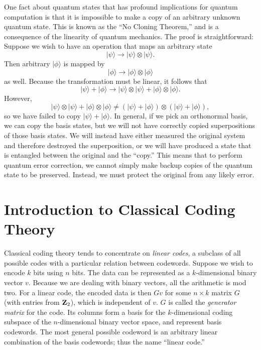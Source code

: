 \documentclass{report}
\newcommand{\ket}[1]{|{#1}\rangle}
\begin{document}
One fact about quantum states that has profound implications for quantum
computation is that it is impossible to make a copy of an arbitrary
unknown quantum state.  This is known as the ``No Cloning Theorem,''
\cite{no-cloning} and is a consequence of the linearity of quantum mechanics.
The proof is straightforward:  Suppose we wish to have an operation that
maps an arbitrary state 
\begin{equation}
\ket{\psi} \rightarrow \ket{\psi} \otimes \ket{\psi}.
\end{equation}
Then arbitrary $\ket{\phi}$ is mapped by
\begin{equation}
\ket{\phi} \rightarrow \ket{\phi} \otimes \ket{\phi}
\end{equation}
as well.  Because the transformation must be linear, it follows that
\begin{equation}
\ket{\psi} + \ket{\phi} \rightarrow \ket{\psi} \otimes \ket{\psi} +
\ket{\phi} \otimes \ket{\phi}.
\end{equation}
However,
\begin{equation}
\ket{\psi} \otimes \ket{\psi} + \ket{\phi} \otimes \ket{\phi} \neq
(\ket{\psi} + \ket{\phi}) \otimes (\ket{\psi} + \ket{\phi}),
\end{equation}
so we have failed to copy $\ket{\psi} + \ket{\phi}$.  In general, if we
pick an orthonormal basis, we can copy the basis states, but we will
not have correctly copied superpositions of those basis states.  We will
instead have either measured the original system and therefore destroyed the
superposition, or we will have produced a state that is entangled between
the original and the ``copy.''  This means that to perform quantum error
correction, we cannot simply make backup copies of the quantum state to
be preserved.  Instead, we must protect the original from any likely error.

\section{Introduction to Classical Coding Theory}
\label{sec-classical}

Classical coding theory tends to concentrate on {\em linear codes}, a 
subclass of all possible codes with a particular relation between codewords.  
Suppose we wish to encode $k$ bits using $n$ bits.  The data can be 
represented as a $k$-dimensional binary vector $v$.  Because we are 
dealing with binary vectors, all the arithmetic is mod two.  For a linear code, 
the encoded data is then $G v$ for some $n \times k$ matrix $G$ (with 
entries from ${\bf Z}_2$), which is independent of $v$.  $G$ is called the 
{\em generator matrix} for the code.  Its columns form a basis for the 
$k$-dimensional coding subspace of the $n$-dimensional binary vector space, 
and represent basis codewords.  The most general possible codeword is an
arbitrary linear combination of the basis codewords; thus the name ``linear
code.''
\end{document}
